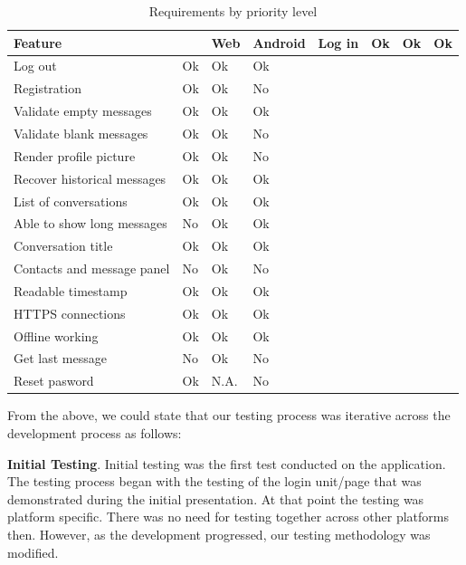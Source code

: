 \begin{table}[ht]
\caption{Requirements by priority level}
\label{tab:requirements}
    \begin{tabular}[c]{ | p{6cm} | p{3cm} | p{3cm} | p{3cm} |}
		\hline
		\centering\textbf{Feature} &  & \centering\textbf{Web} & \centering\textbf{Android}  &
    \hline
    Log in & Ok & Ok & Ok \\
    \hline
    Log out & Ok & Ok & Ok \\
    \hline
    Registration & Ok & Ok &  No \\
    \hline
    Validate empty messages & Ok & Ok & Ok \\
    \hline
    Validate blank messages & Ok & Ok &  No \\
    \hline
    Render profile picture & Ok & Ok & No \\
    \hline
    Recover historical messages & Ok & Ok &  Ok \\
    \hline
    List of conversations & Ok & Ok &  Ok \\
    \hline
    Able to show long messages &  No & Ok & Ok \\
    \hline
    Conversation title & Ok & Ok & Ok \\
    \hline
    Contacts and message panel &  No & Ok &  No \\
    \hline
    Readable timestamp & Ok & Ok & Ok \\
    \hline
    HTTPS connections & Ok & Ok & Ok \\
    \hline
    Offline working & Ok & Ok & Ok \\
    \hline
    Get last message & No & Ok & No \\
    \hline
    Reset pasword & Ok & N.A. & No \\
    \hline
    \end{tabular}
\end{table}



From the above, we could state that our testing process was iterative across the development process as follows: 

\textbf{Initial Testing}.	Initial testing was the first test conducted on the application. The testing process began with the testing of the login unit/page that was demonstrated    during the initial presentation. At that point the testing was platform specific. There was no need for testing together across other platforms then. However, as the development progressed, our testing methodology was modified. 

